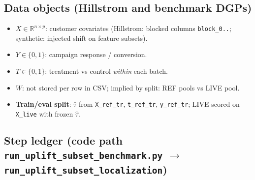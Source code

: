 \documentclass[11pt]{article}
\begin{document}
\subsection{Data objects (Hillstrom and benchmark DGPs)}
\begin{itemize}[nosep]
  \item \textbf{$X\in\mathbb{R}^{n\times p}$}: customer covariates (Hillstrom: blocked columns \texttt{block\_0..}; synthetic: injected shift on feature subsets).
  \item \textbf{$Y\in\{0,1\}$}: campaign response / conversion.
  \item \textbf{$T\in\{0,1\}$}: treatment vs control \emph{within} each batch.
  \item \textbf{$W$}: not stored per row in CSV; implied by split: REF pools vs LIVE pool.
  \item \textbf{Train/eval split}: $\hat\tau$ from \texttt{X\_ref\_tr}, \texttt{t\_ref\_tr}, \texttt{y\_ref\_tr}; LIVE scored on \texttt{X\_live} with frozen $\hat\tau$.
\end{itemize}

\subsection{Step ledger (code path \texttt{run\_uplift\_subset\_benchmark.py} $\rightarrow$ \texttt{run\_uplift\_subset\_localization})}
\end{document}
